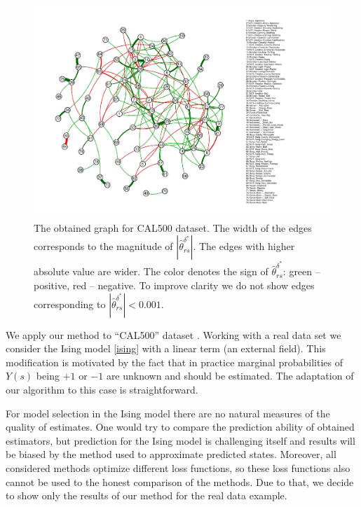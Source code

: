 \documentclass[twoside,11pt]{article}
\begin{document}
\begin{figure}[htb]
 \centering
 \includegraphics[width=1.2\textwidth]{cal500graph_cutted}
 \caption{The obtained graph for CAL500 dataset. The width of the edges corresponds to the magnitude of $|\hat{\theta}^{\delta^*}_{rs}|$. The edges with higher absolute value are wider.
 The color denotes the sign of $\hat{\theta}^{\delta^*}_{rs}$: green -- positive, red -- negative.
 To improve clarity we do not show  edges corresponding to $|\hat{\theta}^{\delta^*}_{rs}|<0.001$.}
 \label{Fig:cal500}
\end{figure}
We apply our method to ``CAL500'' dataset \citep{Turnbull2008}. 
Working with a real data set we consider the Ising model \eqref{ising} with a linear term (an external field). This modification is motivated by the fact that in practice marginal probabilities of $Y(s)$ being $+1$  or $-1$ are unknown and should be estimated. The adaptation of our algorithm to this case is straightforward.  


For model selection in the Ising model there are no natural measures of the quality of estimates. One would try to compare the prediction ability of obtained estimators, but prediction for the Ising model is challenging itself and results will be biased  by the method used to approximate predicted states. Moreover, all considered methods optimize different loss functions, so these loss functions also cannot be used to the honest comparison of the methods. Due to that, we decide to show only the results of our method for the real data example. 
\end{document}
